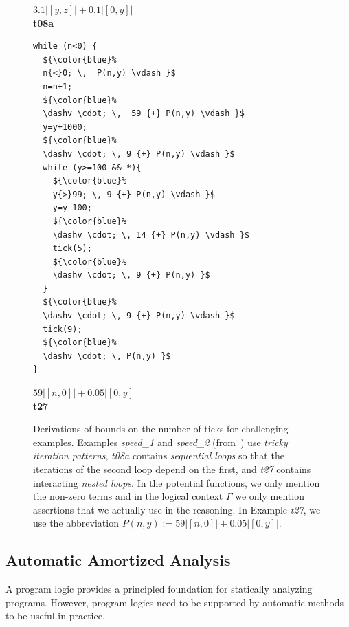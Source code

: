 \documentclass[nocopyrightspace,preprint,pldi]{sigplanconf-pldi15}
\begin{document}
\begin{figure}[t!]
\begin{minipage}[b]{\progwidth}
\begin{center}
$3.1|[y,z]| + 0.1|[0,y]|$
\\[.4\baselineskip]
      {\bf t08a}
    \end{center}
  \end{minipage}
%
\hfill
%
%
%
  \begin{minipage}[b]{\progwidth}
    \begin{center}
   \begin{lstlisting}
while (n<0) {
  ${\color{blue}%
  n{<}0; \,  P(n,y) \vdash }$
  n=n+1;
  ${\color{blue}%
  \dashv \cdot; \,  59 {+} P(n,y) \vdash }$
  y=y+1000;
  ${\color{blue}%
  \dashv \cdot; \, 9 {+} P(n,y) \vdash }$
  while (y>=100 && *){
    ${\color{blue}%
    y{>}99; \, 9 {+} P(n,y) \vdash }$
    y=y-100;
    ${\color{blue}%
    \dashv \cdot; \, 14 {+} P(n,y) \vdash }$
    tick(5);
    ${\color{blue}%
    \dashv \cdot; \, 9 {+} P(n,y) }$
  }
  ${\color{blue}%
  \dashv \cdot; \, 9 {+} P(n,y) \vdash }$
  tick(9);
  ${\color{blue}%
  \dashv \cdot; \, P(n,y) }$
}
   \end{lstlisting}
$59|[n,0]| {+} 0.05|[0,y]|$
\\[.4\baselineskip]
      {\bf t27}
    \end{center}
  \end{minipage}
\vspace{1ex}
\caption{Derivations of bounds on the number of ticks for challenging
  examples.  Examples \emph{speed\_1} and \emph{speed\_2}
  (from~\cite{GulwaniMC09}) use \emph{tricky iteration patterns},
  \emph{t08a} contains \emph{sequential loops} so that the iterations
  of the second loop depend on the first, and \emph{t27} contains
  interacting \emph{nested loops}. In the potential functions, we only
  mention the non-zero terms and in the logical context $\Gamma$ we
  only mention assertions that we actually use in the reasoning. In
  Example \emph{t27}, we use the abbreviation $P(n,y) := 59|[n,0]| {+}
  0.05|[0,y]|$.}
  \label{fig:ex_list}
\end{figure}
%
%

\subsection{Automatic Amortized Analysis}

A program logic provides a principled foundation for statically
analyzing programs.  However, program logics need to be supported by
automatic methods to be useful in practice.  %
\end{document}
